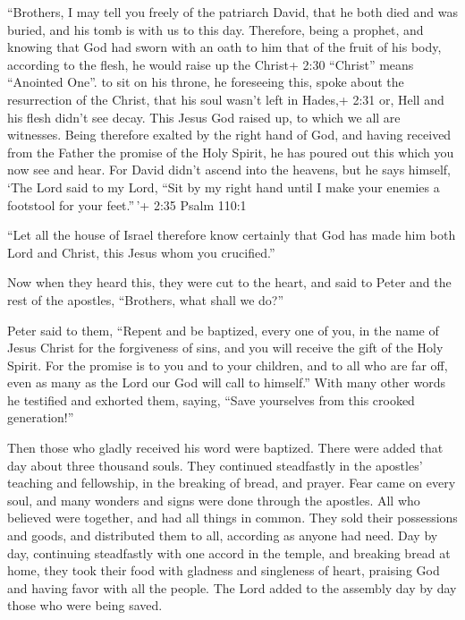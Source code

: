  ``Brothers, I may tell you freely of the patriarch David,
that he both died and was buried, and his tomb is with us to this day.
 Therefore, being a prophet, and knowing that God had sworn
with an oath to him that of the fruit of his body, according to the
flesh, he would raise up the Christ+ 2:30 ``Christ'' means ``Anointed
One''. to sit on his throne,  he foreseeing this, spoke
about the resurrection of the Christ, that his soul wasn't left in
Hades,+ 2:31 or, Hell and his flesh didn't see decay.  This
Jesus God raised up, to which we all are witnesses.  Being
therefore exalted by the right hand of God, and having received from the
Father the promise of the Holy Spirit, he has poured out this which you
now see and hear.  For David didn't ascend into the
heavens, but he says himself, `The Lord said to my Lord, ``Sit by my
right hand  until I make your enemies a footstool for your
feet.''\,'+ 2:35 Psalm 110:1

 ``Let all the house of Israel therefore know certainly
that God has made him both Lord and Christ, this Jesus whom you
crucified.''

 Now when they heard this, they were cut to the heart, and
said to Peter and the rest of the apostles, ``Brothers, what shall we
do?''

 Peter said to them, ``Repent and be baptized, every one of
you, in the name of Jesus Christ for the forgiveness of sins, and you
will receive the gift of the Holy Spirit.  For the promise
is to you and to your children, and to all who are far off, even as many
as the Lord our God will call to himself.''  With many
other words he testified and exhorted them, saying, ``Save yourselves
from this crooked generation!''

 Then those who gladly received his word were baptized.
There were added that day about three thousand souls.  They
continued steadfastly in the apostles' teaching and fellowship, in the
breaking of bread, and prayer.  Fear came on every soul,
and many wonders and signs were done through the apostles. 
All who believed were together, and had all things in common.
 They sold their possessions and goods, and distributed
them to all, according as anyone had need.  Day by day,
continuing steadfastly with one accord in the temple, and breaking bread
at home, they took their food with gladness and singleness of heart,
 praising God and having favor with all the people. The
Lord added to the assembly day by day those who were being saved.

